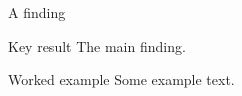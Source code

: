 \documentclass{beamer}
\begin{document}
\begin{frame}{A finding}
  \begin{alertblock}{Key result}
    The main finding.
  \end{alertblock}
  \begin{exampleblock}{Worked example}
    Some example text.
  \end{exampleblock}
\end{frame}
\end{document}

